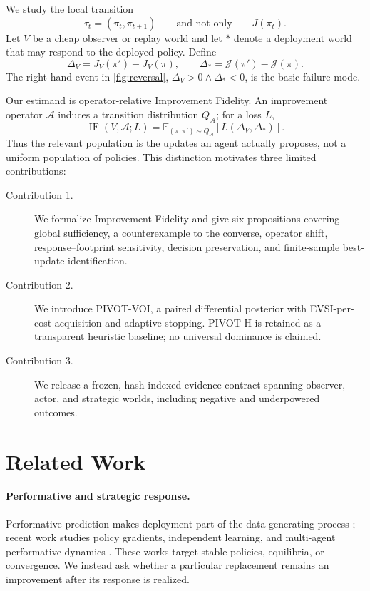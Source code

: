 \documentclass{article}
\newcommand{\E}{\mathbb{E}}
\newcommand{\J}{\mathcal{J}}
\newcommand{\dproxy}{\Delta_V}
\newcommand{\dtrue}{\Delta_*}
\newcommand{\pii}{\pi}
\newcommand{\pip}{\pi'}
\begin{document}
We study the local transition
\begin{equation}
  \tau_t=(\pi_t,\pi_{t+1})
  \qquad\text{and not only}\qquad J(\pi_t).
\end{equation}
Let $V$ be a cheap observer or replay world and let $*$ denote a deployment
world that may respond to the deployed policy.  Define
\begin{equation}
  \dproxy=J_V(\pip)-J_V(\pii),\qquad
  \dtrue=\J(\pip)-\J(\pii).
\end{equation}
The right-hand event in \cref{fig:reversal},
$\dproxy>0\land\dtrue<0$, is the basic failure mode.

Our estimand is operator-relative Improvement Fidelity.  An improvement operator $\mathcal A$
induces a transition distribution $Q_{\mathcal A}$; for a loss $L$,
\begin{equation}
  \operatorname{IF}(V,\mathcal A;L)=
  \E_{(\pi,\pi')\sim Q_{\mathcal A}}
  \left[L(\Delta_V,\Delta_*)\right].
\end{equation}
Thus the relevant population is the updates an agent actually proposes, not a
uniform population of policies.  This distinction motivates three limited
contributions:
\begin{description}
  \item[Contribution 1.] We formalize Improvement Fidelity and give six propositions covering
  global sufficiency, a counterexample to the converse, operator shift,
  response--footprint sensitivity, decision preservation, and finite-sample
  best-update identification.
  \item[Contribution 2.] We introduce PIVOT-VOI, a paired differential posterior with
  EVSI-per-cost acquisition and adaptive stopping.  PIVOT-H is retained as a
  transparent heuristic baseline; no universal dominance is claimed.
  \item[Contribution 3.] We release a frozen, hash-indexed evidence contract spanning observer,
  actor, and strategic worlds, including negative and underpowered outcomes.
\end{description}

\section{Related Work}
\paragraph{Performative and strategic response.}
Performative prediction makes deployment part of the data-generating process
\cite{perdomo2020performative,mandal2022performative}; recent work studies
policy gradients, independent learning, and multi-agent performative dynamics
\cite{performativepg2025,performativempg2025,map2025,multiagentperformative2022}.
These works target stable policies, equilibria, or convergence.  We instead
ask whether a particular replacement remains an improvement after its
response is realized.
\end{document}
